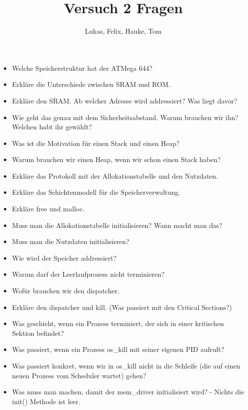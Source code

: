 \documentclass[12pt,a4paper]{article}
\title{Versuch 2 Fragen}
\author{Lukas, Felix, Hauke, Tom}
\begin{document}
\maketitle

\begin{itemize}
    \item Welche Speicherstruktur hat der ATMega 644? 
    \item Erkläre die Unterschiede zwischen SRAM und ROM.
    \item Erkläre den SRAM. Ab welcher Adresse wird addressiert? Was liegt davor?
    \item Wie geht das genau mit dem Sicherheitsabstand. Warum brauchen wir ihn? Welchen habt ihr gewählt?
    \item Was ist die Motivation für einen Stack und einen Heap?
    \item Warum brauchen wir einen Heap, wenn wir schon einen Stack haben?
    \item Erkläre das Protokoll mit der Allokationstabelle und den Nutzdaten.
    \item Erkläre das Schichtenmodell für die Speicherverwaltung.
    \item Erkläre free und malloc.
    \item Muss man die Allokationstabelle initialisieren? Wann macht man das?
    \item Muss man die Nutzdaten initialisieren?
    \item Wie wird der Speicher addressiert?
    \item Warum darf der Leerlaufprozess nicht terminieren?
    \item Wofür brauchen wir den dispatcher.
    \item Erkläre den dispatcher und kill. (Was passiert mit den Critical Sections?)
    \item Was geschieht, wenn ein Prozess terminiert, der sich in einer kritischen Sektion befindet?
    \item Was passiert, wenn ein Prozess os\_kill  mit seiner eigenen PID aufruft?
    \item Was passiert konkret, wenn wir in os\_kill nicht in die Schleife (die auf einen neuen Prozess vom Scheduler wartet) gehen?
    \item Was muss man machen, damit der mem\_driver initialisiert wird? - Nichts die init() Methode ist leer. 
\end{itemize}
\end{document}
